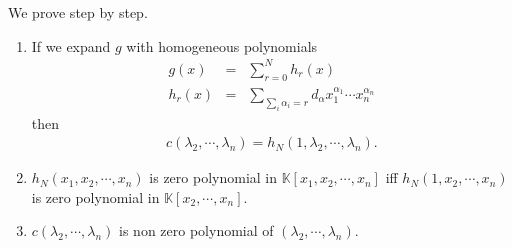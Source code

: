 \documentclass[11pt]{book}
\begin{document}
We prove step by step.
\begin{enumerate}
\item If we expand $g$ with homogeneous polynomials
\begin{eqnarray}
g(x) &=& \sum_{r=0}^N h_r(x) \\
h_r(x) &=& \sum_{\sum_i \alpha_i = r} d_{\alpha} x_1^{\alpha_1} \cdots x_n^{\alpha_n} 
\end{eqnarray}
then
\begin{eqnarray}
c(\lambda_2, \cdots, \lambda_n) = h_N(1, \lambda_2, \cdots, \lambda_n).
\end{eqnarray}

\item
$h_N(x_1, x_2, \cdots, x_n)$ is zero polynomial in $\mathbb{K}[x_1, x_2, \cdots, x_n]$ iff $h_N(1, x_2, \cdots, x_n)$ is zero polynomial in $\mathbb{K}[x_2, \cdots, x_n]$.

\item
$c(\lambda_2, \cdots, \lambda_n)$ is non zero polynomial of $(\lambda_2, \cdots, \lambda_n)$.

\end{enumerate}
\end{document}
